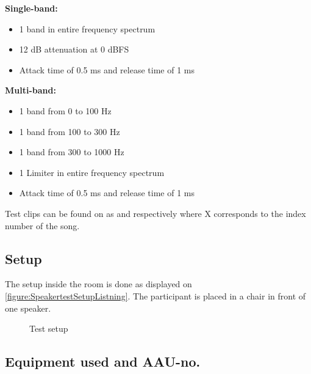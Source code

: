 \noindent\begin{minipage}[t]{0.5\linewidth}
    \textbf{Single-band:}
    \begin{itemize}\addtolength{\itemsep}{-.35\baselineskip} 
    \item 1 band in entire frequency spectrum
    \item 12 dB attenuation at 0 dBFS
    \item Attack time of 0.5 ms and release time of 1 ms
    \end{itemize}
    \end{minipage}%
    \begin{minipage}[t]{0.5\linewidth}
    \textbf{Multi-band:}
    \begin{itemize}\addtolength{\itemsep}{-.35\baselineskip} 
    \item 1 band from 0 to 100 Hz
    \item 1 band from 100 to 300 Hz
    \item 1 band from 300 to 1000 Hz
    \item 1 Limiter in entire frequency spectrum
    \item Attack time of 0.5 ms and release time of 1 ms
    \end{itemize}
\end{minipage}\par\bigskip
Test clips can be found on  as  and  respectively where X corresponds to the index number of the song.



\subsection*{Setup}
The setup inside the room is done as displayed on \autoref{figure:SpeakertestSetupListning}. The participant is placed in a chair in front of one speaker.
\begin{figure}[H]
\centering
{}
\caption{Test setup}
\label{figure:SpeakertestSetupListning}
\end{figure}

\subsection*{Equipment used and AAU-no.}

